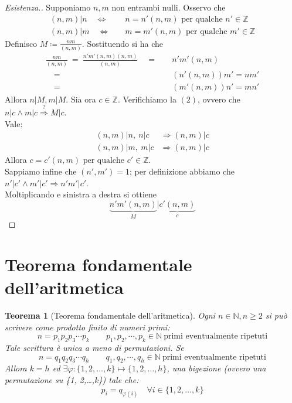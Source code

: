\documentclass[12pt,twoscolu]{article}
\newcommand{\N}{\mathbb{N}}
\newcommand{\Z}{\mathbb{Z}}
\newcommand{\sesolose}{\Leftrightarrow}
\newcommand{\implica}{\Longrightarrow}
\newcommand{\pq}{\text{ per qualche }}
\renewcommand\qedsymbol{$\blacksquare$}
\newtheorem{theorem}{Teorema}
\begin{document}
\renewcommand\qedsymbol{$\blacksquare$}
\begin{proof}[Esistenza.]
Supponiamo $n, m$ non entrambi nulli. Osservo che
\begin{align*}
(n, m)|n \quad\sesolose&\quad n = n'(n,m) \pq n'\in\Z \\
(n, m)|m \quad\sesolose&\quad m = m'(n,m) \pq m'\in\Z
\end{align*}
Definisco $\displaystyle M \coloneqq \frac{nm}{(n, m)}$. Sostituendo si ha che
\begin{align*}
\frac{nm}{(n, m)}\ = \ \frac{n'm'(n, m)(n, m)}{(n, m)} \quad=&\quad n'm'(n,m) \\
\quad=&\quad (n'(n, m))m' = nm' \\
\quad=&\quad (m'(n,m))n' = mn'
\end{align*}
Allora $n | M, m | M$. Sia ora $c \in \Z$. Verifichiamo la $(2)$, ovvero che $n | c \land m | c \stackrel{?}{\implica} M | c$.
\\ Vale:
\begin{align*}
(n, m) | n,\ n|c &\implica (n,m)|c \\
(n, m) | m,\ m|c &\implica (n,m)|c 
\end{align*}
Allora $c = c'(n, m) \pq c' \in \Z$.
\\Sappiamo infine che $(n', m') = 1$; per definizione abbiamo che $n' | c' \land m' | c' \implica n'm' | c'$.
\\Moltiplicando e sinistra a destra si ottiene
$$ \underbrace{n'm'(n,m)}_M | \underbrace{c'(n,m)}_c$$
\end{proof}

\section{Teorema fondamentale dell'aritmetica}
\begin{theorem}[Teorema fondamentale dell'aritmetica]
Ogni $n \in \N, n \ge 2$ si può scrivere come prodotto finito di numeri primi:
$$ n = p_1 p_2 p_3 \cdots p_k\qquad p_1, p_2, \cdots, p_k \in \N \ \text{primi eventualmente ripetuti}$$
Tale scrittura è unica a meno di permutazioni. Se
$$ n = q_1 q_2 q_3 \cdots q_h\qquad q_1, q_2, \cdots, q_h \in \N \ \text{primi eventualmente ripetuti}$$
Allora $k = h$ ed $\exists \varphi : \{1, 2,\ldots ,k\} \mapsto \{1, 2, \ldots , h\}$, una bigezione (ovvero una permutazione su \{1, 2,\ldots ,k\}) tale che:
$$ p_i = q_{\varphi(i)}\quad \forall i \in \{1, 2,\ldots ,k\} $$
\end{theorem}
\end{document}
